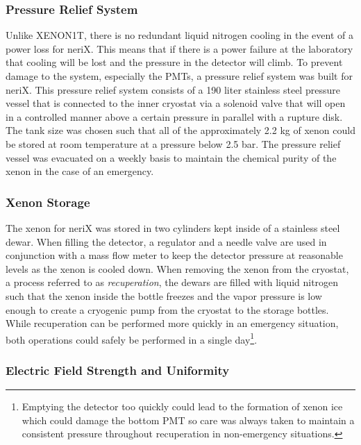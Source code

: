 \subsubsection{Pressure Relief System}
\label{sec:nerix_pressure_relief}

Unlike XENON1T, there is no redundant liquid nitrogen cooling in the event of a power loss for neriX.  This means that if there is a power failure at the laboratory that cooling will be lost and the pressure in the detector will climb.  To prevent damage to the system, especially the PMTs, a pressure relief system was built for neriX.  This pressure relief system consists of a 190 liter stainless steel pressure vessel that is connected to the inner cryostat via a solenoid valve that will open in a controlled manner above a certain pressure in parallel with a rupture disk.  The tank size was chosen such that all of the approximately 2.2 kg of xenon could be stored at room temperature at a pressure below 2.5 bar.  The pressure relief vessel was evacuated on a weekly basis to maintain the chemical purity of the xenon in the case of an emergency.


\subsubsection{Xenon Storage}

The xenon for neriX was stored in two cylinders kept inside of a stainless steel dewar.  When filling the detector, a regulator and a needle valve are used in conjunction with a mass flow meter to keep the detector pressure at reasonable levels as the xenon is cooled down.  When removing the xenon from the cryostat, a process referred to as \textit{recuperation}, the dewars are filled with liquid nitrogen such that the xenon inside the bottle freezes and the vapor pressure is low enough to create a cryogenic pump from the cryostat to the storage bottles.  While recuperation can be performed more quickly in an emergency situation, both operations could safely be performed in a single day\footnote{Emptying the detector too quickly could lead to the formation of xenon ice which could damage the bottom PMT so care was always taken to maintain a consistent pressure throughout recuperation in non-emergency situations.}.


\subsubsection{Electric Field Strength and Uniformity}

